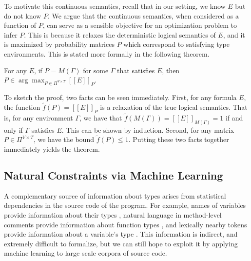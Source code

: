 \documentclass[sigplan,10pt,anonymous]{acmart} %
\newcommand{\qqpi}[2]{[\![#2]\!]_{#1}}
\theoremstyle{plain}
\theoremstyle{remark}
\theoremstyle{definition}
\begin{document}
To motivate this continuous semantics, recall that in our setting, we know $E$ but
do not know $P$. We argue that the continuous semantics,
when considered as a function of $P$, can serve as a sensible
objective for an optimization problem to infer $P.$ This is because it relaxes
the deterministic logical semantics of $E$, and it is maximized
by probability matrices $P$ which correspond to satisfying type environments. This is stated
more formally in the following theorem.
\begin{theorem}
  For any $E$, if $P = M(\Gamma)$ for some $\Gamma$ that satisfies $E$, then $P \in \arg\max_{P \in \Pi^{V \times T}} \qqpi{P}{E}$.
\end{theorem}

To sketch the proof, two facts can be seen immediately.
First, for any formula $E$, the function $\tilde{f}(P) = \qqpi{P}{E}$ is a relaxation
of the true logical semantics. That is, for any environment $\Gamma$, we have that
$\tilde{f}(M(\Gamma)) = \qqpi{M(\Gamma)}{E} = 1$ if and only if $\Gamma$ satisfies $E.$ This can be shown
by induction. Second, for any matrix $P \in \Pi^{V \times T}$,
we have the bound $\tilde{f}(P) \leq 1$. Putting these two facts together
immediately yields the theorem.


\subsection{Natural Constraints via Machine Learning}\label{ssec:natcon}

A complementary source of information about types arises from statistical dependencies
in the source code of the program.  For example, names of variables provide
information about their types \cite{xu16}, natural language in
method-level comments provide information about function types \cite{malik19},
and lexically nearby tokens provide information
about a variable's type \cite{hellendoorn18}.
This information is indirect, and extremely difficult to formalize,
but we can still hope to exploit it by applying machine learning
to large scale corpora of source code.
\end{document}
